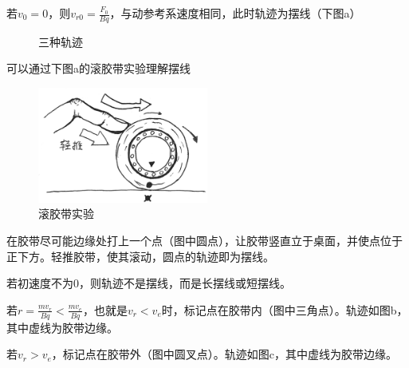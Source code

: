 \documentclass[UTF8]{article}
\begin{document}
若$v_{0}=0$，则$v_{r0}=\frac{F_{0}}{Bq}$，与动参考系速度相同，此时轨迹为摆线（下图a）

\begin{figure}[H]
    \centering
    \caption{三种轨迹}
\end{figure}

可以通过下图a的滚胶带实验理解摆线

\begin{figure}[htbp]
    \centering
    \includegraphics[width=0.5\textwidth]{roll.png}
    \caption{滚胶带实验}
\end{figure}

在胶带尽可能边缘处打上一个点（图中圆点），让胶带竖直立于桌面，并使点位于正下方。轻推胶带，使其滚动，圆点的轨迹即为摆线。

若初速度不为0，则轨迹不是摆线，而是长摆线或短摆线。

若$r=\frac{mv_{r}}{Bq} < \frac{mv_{e}}{Bq}$，也就是$v_{r} < v_{e}$时，标记点在胶带内（图中三角点）。轨迹如图b，其中虚线为胶带边缘。

若$v_{r} > v_{e}$，标记点在胶带外（图中圆叉点）。轨迹如图c，其中虚线为胶带边缘。
\end{document}
